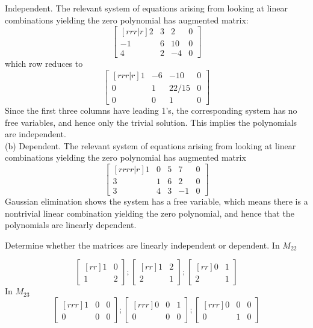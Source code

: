 \ee
\begin{solution}
\noindent Independent. The relevant system of equations arising from looking at linear combinations yielding the zero polynomial has augmented matrix:
\[
\begin{bmatrix}[rrr|r]
2&3&2&0\\
-1&6&10&0\\
4&2&-4&0
\end{bmatrix}
\]
which row reduces to 
\[
\begin{bmatrix}[rrr|r]
1&-6&-10&0\\
0&1&22/15&0\\
0&0&1&0
\end{bmatrix}
\]
Since the first three columns have leading 1's, the corresponding system has no free variables, and hence only the trivial solution. This implies the polynomials are independent.
\\ (b) Dependent. The relevant system of equations arising from looking at linear combinations yielding the zero polynomial has augmented matrix 
\[
\begin{bmatrix}[rrrr|r]
1&0&5&7&0\\
3&1&6&2&0\\
3&4&3&-1&0
\end{bmatrix}
\]
Gaussian elimination shows the system has a free variable, which means there is a nontrivial linear combination yielding the zero polynomial, and hence that the polynomials are linearly dependent.
\end{solution}
\ii Determine whether the matrices are linearly independent or dependent.
\bb
\ii  In $M_{22}$

\[
\begin{bmatrix}[rr]
1&0\\
1&2
\end{bmatrix}
;
\begin{bmatrix}[rr]
1&2\\
2&1
\end{bmatrix}
;
\begin{bmatrix}[rr]
0&1\\
2&1
\end{bmatrix}
\]
\ii In $M_{23}$
\[
\begin{bmatrix}[rrr]
1&0&0\\
0&0&0
\end{bmatrix}
;
\begin{bmatrix}[rrr]
0&0&1\\
0&0&0
\end{bmatrix}
;
\begin{bmatrix}[rrr]
0&0&0\\
0&1&0
\end{bmatrix}
\]

